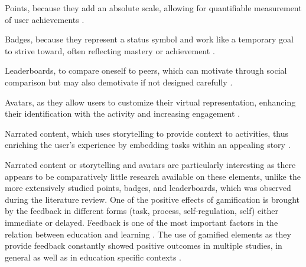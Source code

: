\begin{APAitemize}
    \item Points, because they add an absolute scale, allowing for quantifiable measurement of user achievements \parencite{hamariDoesGamificationWork2014}.
    \item Badges, because they represent a status symbol and work like a temporary goal to strive toward, often reflecting mastery or achievement \parencite{gonzalezGamificationIntelligentTutoring2014}.
    \item Leaderboards, to compare oneself to peers, which can motivate through social comparison but may also demotivate if not designed carefully \parencite{hamariDoesGamificationWork2014, almeidaSystematicMappingNegative2021}.
    \item Avatars, as they allow users to customize their virtual representation, enhancing their identification with the activity and increasing engagement \parencite{gonzalezGamificationIntelligentTutoring2014}.
    \item Narrated content, which uses storytelling to provide context to activities, thus enriching the user's experience by embedding tasks within an appealing story \parencite{gonzalezGamificationIntelligentTutoring2014}.
\end{APAitemize}
Narrated content or storytelling and avatars are particularly interesting as there appears to be comparatively little research available on these elements, unlike the more extensively studied points, badges, and leaderboards, which was observed during the literature review.
One of the positive effects of gamification is brought by the feedback in different forms (task, process, self-regulation, self) either immediate or delayed.
Feedback is one of the most important factors in the relation between education and learning \parencite{sailerGamificationLearningMetaanalysis2020}.
The use of gamified elements as they provide feedback constantly \parencite{woutersMetaanalysisCognitiveMotivational2013} showed positive outcomes in multiple studies, in general \parencite{hamariDoesGamificationWork2014} as well as in education specific contexts \parencite{sailerGamificationLearningMetaanalysis2020}.


